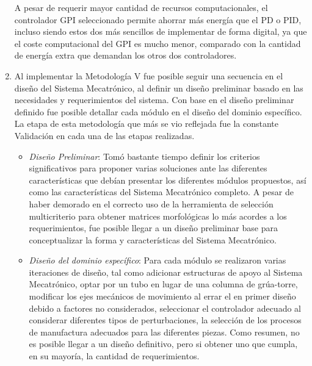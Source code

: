 \begin{enumerate}
    A pesar de requerir mayor cantidad de recursos computacionales, el controlador GPI seleccionado permite ahorrar más energía que el PD o PID, incluso siendo estos dos más sencillos de implementar de forma digital, ya que el coste computacional del GPI es mucho menor, comparado con la cantidad de energía extra que demandan los otros dos controladores.
    \item Al implementar la Metodología V fue posible seguir una secuencia en el diseño del Sistema Mecatrónico, al definir un diseño preliminar basado en las necesidades y requerimientos del sistema. Con base en el diseño preliminar definido fue posible detallar cada módulo en el diseño del dominio específico. La etapa de esta metodología que más se vio reflejada fue la constante Validación en cada una de las etapas realizadas.
    \begin{itemize}
        \item \textit{Diseño Preliminar}: Tomó bastante tiempo definir los criterios significativos para proponer varias soluciones ante las diferentes características que debían presentar los diferentes módulos propuestos, así como las características del Sistema Mecatrónico completo. A pesar de haber demorado en el correcto uso de la herramienta de selección multicriterio para obtener matrices morfológicas lo más acordes a los requerimientos, fue posible llegar a un diseño preliminar base para conceptualizar la forma y características del Sistema Mecatrónico.
        \item \textit{Diseño del dominio específico}: Para cada módulo se realizaron varias iteraciones de diseño, tal como adicionar estructuras de apoyo al Sistema Mecatrónico, optar por un tubo en lugar de una columna de grúa-torre, modificar los ejes mecánicos de movimiento al errar el en primer diseño debido a factores no considerados, seleccionar el controlador adecuado al considerar diferentes tipos de perturbaciones, la selección de los procesos de manufactura adecuados para las diferentes piezas. Como resumen, no es posible llegar a un diseño definitivo, pero si obtener uno que cumpla, en su mayoría, la cantidad de requerimientos.

\end{itemize}
\end{enumerate}
